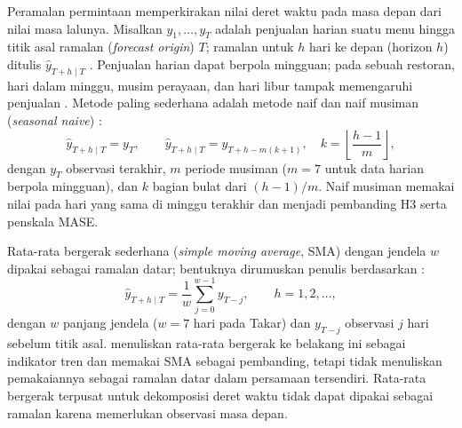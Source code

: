 Peramalan permintaan memperkirakan nilai deret waktu pada masa depan dari nilai masa lalunya. Misalkan $y_1, \dots, y_T$ adalah penjualan harian suatu menu hingga titik asal ramalan (\textit{forecast origin}) $T$; ramalan untuk $h$ hari ke depan (horizon $h$) ditulis $\hat{y}_{T+h\mid T}$ \citep*{hyndman2021forecasting}. Penjualan harian dapat berpola mingguan; pada sebuah restoran, hari dalam minggu, musim perayaan, dan hari libur tampak memengaruhi penjualan \citep*{pazhamannil2025optimization}. Metode paling sederhana adalah metode naif dan naif musiman (\textit{seasonal naive}) \citep*{hyndman2021forecasting}:
\begin{equation}
\hat{y}_{T+h\mid T} = y_T, \qquad \hat{y}_{T+h\mid T} = y_{T+h-m(k+1)}, \quad k = \left\lfloor \frac{h-1}{m} \right\rfloor,
\label{eq:naive}
\end{equation}
dengan $y_T$ observasi terakhir, $m$ periode musiman ($m = 7$ untuk data harian berpola mingguan), dan $k$ bagian bulat dari $(h-1)/m$. Naif musiman memakai nilai pada hari yang sama di minggu terakhir dan menjadi pembanding H3 serta penskala MASE.

Rata-rata bergerak sederhana (\textit{simple moving average}, SMA) dengan jendela $w$ dipakai sebagai ramalan datar; bentuknya dirumuskan penulis berdasarkan \citet*{lauren2026optimizing}:
\begin{equation}
\hat{y}_{T+h\mid T} = \frac{1}{w}\sum_{j=0}^{w-1} y_{T-j}, \qquad h = 1, 2, \dots,
\label{eq:ma}
\end{equation}
dengan $w$ panjang jendela ($w = 7$ hari pada Takar) dan $y_{T-j}$ observasi $j$ hari sebelum titik asal. \citet*{lauren2026optimizing} menuliskan rata-rata bergerak ke belakang ini sebagai indikator tren dan memakai SMA sebagai pembanding, tetapi tidak menuliskan pemakaiannya sebagai ramalan datar dalam persamaan tersendiri. Rata-rata bergerak terpusat untuk dekomposisi deret waktu \citep*{hyndman2021forecasting} tidak dapat dipakai sebagai ramalan karena memerlukan observasi masa depan.

